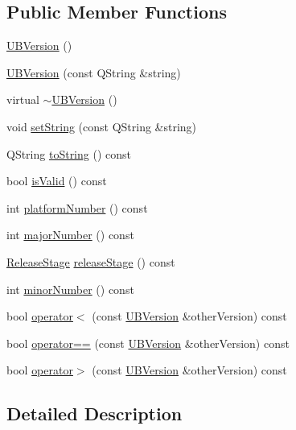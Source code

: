 \subsection*{Public Member Functions}
\begin{DoxyCompactItemize}
\item 
\hyperlink{class_u_b_version_a8de16363b89e71b411aaea85ccd85ca6}{U\-B\-Version} ()
\item 
\hyperlink{class_u_b_version_a66e980a3042307690c36fe6722b3be65}{U\-B\-Version} (const Q\-String \&string)
\item 
virtual \hyperlink{class_u_b_version_a6b8806e3a3bc6cfc0fe36c5949319334}{$\sim$\-U\-B\-Version} ()
\item 
void \hyperlink{class_u_b_version_a9bd4c45d822805cdb385011efe919b6e}{set\-String} (const Q\-String \&string)
\item 
Q\-String \hyperlink{class_u_b_version_a7dc5d2b5857cb37713d04705a948e41c}{to\-String} () const 
\item 
bool \hyperlink{class_u_b_version_ab16121026b0d5adef791a9c9c7a6c2a5}{is\-Valid} () const 
\item 
int \hyperlink{class_u_b_version_a2b36e2c1e8e7d7d4f460d6fb4be583cf}{platform\-Number} () const 
\item 
int \hyperlink{class_u_b_version_a8c40c9646522bc7823b1471dae667032}{major\-Number} () const 
\item 
\hyperlink{_u_b_version_8h_a0ba9715b6fc5eba4291eb57bb444b2f4}{Release\-Stage} \hyperlink{class_u_b_version_a33dbf7bcbeac1846a362b511ffe0c2c3}{release\-Stage} () const 
\item 
int \hyperlink{class_u_b_version_a4cd2b7b3fc51f76729f511858be8986c}{minor\-Number} () const 
\item 
bool \hyperlink{class_u_b_version_af3c0eea3ec18a269184cf7419bc7edaf}{operator$<$} (const \hyperlink{class_u_b_version}{U\-B\-Version} \&other\-Version) const 
\item 
bool \hyperlink{class_u_b_version_afb567c978f399a89f875de8c193e99c6}{operator==} (const \hyperlink{class_u_b_version}{U\-B\-Version} \&other\-Version) const 
\item 
bool \hyperlink{class_u_b_version_a6bfa26312caaf38e4d6b24c566304f1a}{operator$>$} (const \hyperlink{class_u_b_version}{U\-B\-Version} \&other\-Version) const 
\end{DoxyCompactItemize}


\subsection{Detailed Description}


